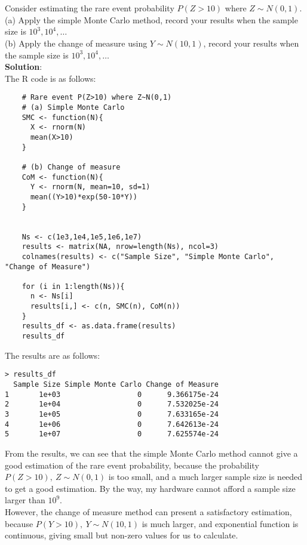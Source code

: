\documentclass[UTF8]{ctexart}
\begin{document}
\section{}
Consider estimating the rare event probability $P(Z > 10)$ where $Z \sim N(0, 1)$.\\
(a) Apply the simple Monte Carlo method, record your results when the sample size
is $10^3, 10^4, \ldots$\\
(b) Apply the change of measure using $Y \sim N(10, 1)$, record your results when the
sample size is $10^3, 10^4, \ldots$\\
\textbf{Solution}:\\
The R code is as follows:
\begin{lstlisting}
    # Rare event P(Z>10) where Z~N(0,1)
    # (a) Simple Monte Carlo
    SMC <- function(N){
      X <- rnorm(N)
      mean(X>10)
    }
    
    # (b) Change of measure
    CoM <- function(N){
      Y <- rnorm(N, mean=10, sd=1)
      mean((Y>10)*exp(50-10*Y))
    }
    
    
    Ns <- c(1e3,1e4,1e5,1e6,1e7)
    results <- matrix(NA, nrow=length(Ns), ncol=3)
    colnames(results) <- c("Sample Size", "Simple Monte Carlo", "Change of Measure")
    
    for (i in 1:length(Ns)){
      n <- Ns[i]
      results[i,] <- c(n, SMC(n), CoM(n))
    }
    results_df <- as.data.frame(results)
    results_df
\end{lstlisting}
The results are as follows:
\begin{lstlisting}
> results_df
  Sample Size Simple Monte Carlo Change of Measure
1       1e+03                  0      9.366175e-24
2       1e+04                  0      7.532025e-24
3       1e+05                  0      7.633165e-24
4       1e+06                  0      7.642613e-24
5       1e+07                  0      7.625574e-24
\end{lstlisting}
From the results, we can see that the simple Monte Carlo method cannot give a good estimation of the rare event probability,
because the probability $P(Z > 10), \ Z \sim N(0, 1)$ is too small, and a much larger sample size is needed to get a good estimation. By the way, my hardware cannot afford a sample size larger than $10^9$.\\
However, the change of measure method can present a satisfactory estimation, because $P(Y>10), \ Y \sim N(10,1)$ is much larger,
and exponential function is continuous, giving small but non-zero values for us to calculate.
\end{document}
